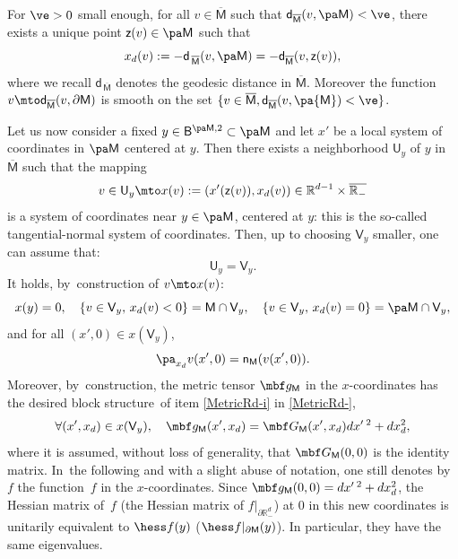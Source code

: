 For $\ve>0$ small enough, for all $v\in \overline { \mathsf M}$ such that $\mathsf d_{\overline { \mathsf M}}(v,\pa \mathsf M)<\ve$, there exists a unique
point $\mathsf z(v)\in \pa \mathsf M$ such that
\[
x_d(v):=-\mathsf d_{\, \overline {\mathsf M}}(v,\pa \mathsf M)=-\mathsf d_{ \overline {\mathsf M}}(v,\mathsf z(v)),
\]
where we recall $\mathsf d_{\, \overline{\mathsf M}}$ denotes the
geodesic distance in $ \overline {\mathsf M}$. Moreover the function
$v\mto \mathsf d_{ \overline {\mathsf M}}(v,\partial \mathsf M)$ is smooth on the set $\{v\in \overline {\mathsf M}, \mathsf d_{\overline{ \mathsf M}}(v,\pa {\mathsf M})<\ve\}$.

Let us now consider a fixed $y\in \mathsf B^{\pa \mathsf M,2}\subset \pa \mathsf M$ and let $x'$ be a local system of coordinates in $\pa \mathsf M$ centered at $y$. Then there exists a neighborhood $\mathsf U_y$ of $y$ in $\overline {\mathsf M}$ such that the mapping\begin{equation}\label{eq.norm-teng}
v\in \mathsf U_y \mto x(v):=(x'(\mathsf z(v)),x_d(v))\in \mathbb R^{d-1}\times \overline{\mathbb R_-}
\end{equation}
is a system of coordinates near $y\in \pa \mathsf M$, centered at
$y$: this is the so-called tangential-normal system of coordinates. Then, up to choosing $\mathsf V_y$ smaller, one can assume that:
\[
\mathsf U_y=\mathsf V_y.
\]
It holds, by~construction of $v\mto x(v)$:
\[
x(y)=0,\quad \{v\in \mathsf V_y, \, x_d(v)<0\}= \mathsf M\cap \mathsf V_y,\quad
\{v\in \mathsf V_y,\, x_d(v)=0\}=\pa \mathsf M \cap \mathsf V_y,
\]
and for all $(x',0)\in x(\mathsf V_y)$,
\[
\pa _{x_d}v(x',0) = \mathsf n_{\mathsf M}(v(x',0)).
\]
Moreover, by~construction, the metric tensor $\mbf g_{\mathsf M}$ in the $x$-coordinates has the desired block structure~of item \eqref{MetricRd-i} in \ref{MetricRd-}, \ie
\begin{equation}\label{g_y}
\forall (x',x_d)\in x(\mathsf V_y), \quad \mbf g_{\mathsf M}(x',x_d)=\mbf G_{\mathsf M}(x',x_d)dx'\,^2+dx_d^2,
\end{equation}
where it is assumed, without loss of generality, that $\mbf G_{\mathsf
M} (0,0)$ is the identity matrix. In~the following and with a slight abuse of notation, one still
denotes by $f$ the function~$f$ in the $x$-coordinates. Since $\mbf
g_{\mathsf M}(0,0)= dx'\,^2+dx_d^2$, the
Hessian matrix of~$f$ (\resp the Hessian matrix of
$f|_{\partial \mathbb R_-^d}$) at $0$ in this new coordinates is unitarily equivalent
to $\hess f(y)$ (\resp $\hess f|_{\partial \mathsf M}(y)$). In
particular, they have the same eigenvalues.
